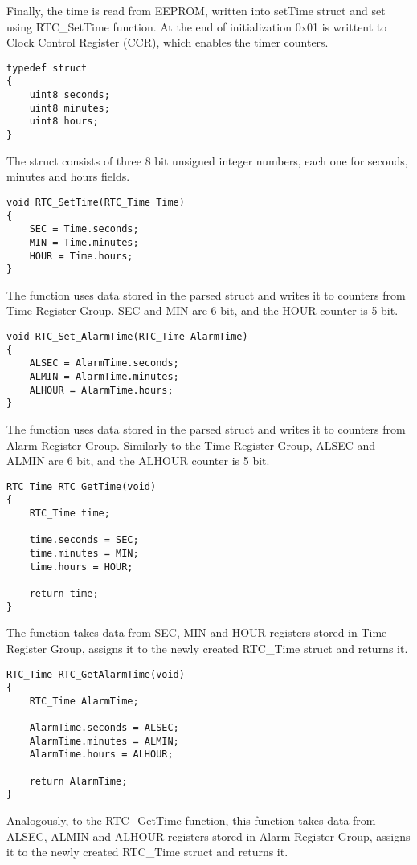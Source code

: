 \documentclass[10pt]{article}
\begin{document}
Finally, the time is read from EEPROM, written into setTime struct and set using RTC\_SetTime function. At the end of initialization 0x01 is writtent to Clock Control Register (CCR), which enables the timer counters.

	\begin{lstlisting}[caption = {RTC struct}]
typedef struct
{
	uint8 seconds;
	uint8 minutes;
	uint8 hours;
} 
	\end{lstlisting}
	The struct consists of three 8 bit unsigned integer numbers, each one for seconds, minutes and hours fields.

	\begin{lstlisting}[caption = {Setting time in the register function}]
void RTC_SetTime(RTC_Time Time)
{
	SEC = Time.seconds;
	MIN = Time.minutes;
	HOUR = Time.hours;
}
	\end{lstlisting}
	The function uses data stored in the parsed struct and writes it to counters from Time Register Group. SEC and MIN are 6 bit, and the HOUR counter is 5 bit.

	\begin{lstlisting}[caption = {Setting alarm time in the register function}]
void RTC_Set_AlarmTime(RTC_Time AlarmTime)
{
	ALSEC = AlarmTime.seconds;
	ALMIN = AlarmTime.minutes;
	ALHOUR = AlarmTime.hours;
}
	\end{lstlisting}
	The function uses data stored in the parsed struct and writes it to counters from Alarm Register Group. Similarly to the Time Register Group, ALSEC and ALMIN are 6 bit, and the ALHOUR counter is 5 bit.

	\begin{lstlisting}[caption = {Getting time from the register function}]
RTC_Time RTC_GetTime(void)
{
	RTC_Time time;

	time.seconds = SEC;
	time.minutes = MIN;
	time.hours = HOUR;

	return time;
}
	\end{lstlisting}
	The function takes data from SEC, MIN and HOUR registers stored in Time Register Group, assigns it to the newly created RTC\_Time struct and returns it.

	\begin{lstlisting}[caption = {Getting alarm time from the register function}]
RTC_Time RTC_GetAlarmTime(void)
{
	RTC_Time AlarmTime;

	AlarmTime.seconds = ALSEC;
	AlarmTime.minutes = ALMIN;
	AlarmTime.hours = ALHOUR;

	return AlarmTime;
}
	\end{lstlisting}
	Analogously, to the RTC\_GetTime function, this function takes data from ALSEC, ALMIN and ALHOUR registers stored in Alarm Register Group, assigns it to the newly created RTC\_Time struct and returns it.
\end{document}
